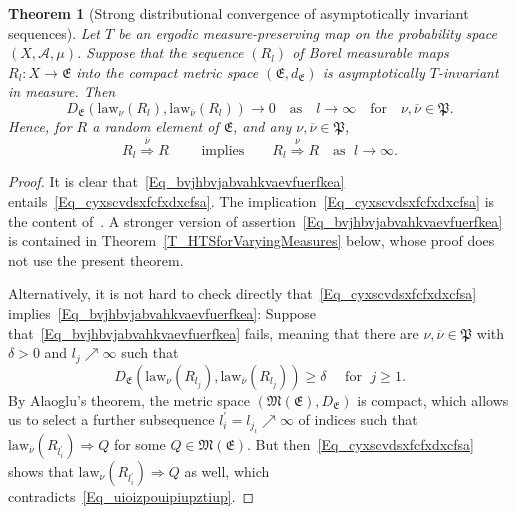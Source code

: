 \documentclass[10pt]{amsart}
\newtheorem{theo}{Theorem}[section]
\theoremstyle{definition}\newtheorem{defi}[theo]{Definition}\newtheorem{rema}[theo]{Remark}\newtheorem{exam}[theo]{Example}\newtheorem{exem}[theo]{Example}\newtheorem{nota}[theo]{Notation}
\newcommand{\clA}{\mathcal{A}}
\newcommand{\law}{\mathrm{law}}
\newcommand{\frkP}{\mathfrak{P}}
\newcommand{\frkE}{\mathfrak{E}}
\newcommand{\frkM}{\mathfrak{M}}
\begin{document}
\begin{theo}[{Strong distributional convergence of asymptotically invariant sequences}]\label{T_MyOldStrongDistrCgeThm}
Let $T$ be an ergodic measure-preserving map on the probability space $(X,\clA,\mu)$. Suppose that the sequence $(R_{l})$ of Borel measurable maps $R_{l}:X\rightarrow \frkE$ into the compact metric space $(\frkE,d_{\frkE})$ is asymptotically $T$-invariant in measure. Then
\begin{equation}\label{Eq_bvjhbvjabvahkvaevfuerfkea}
D_{\frkE}\left(\law_{\nu}(R_{l}),\law_{\overline{\nu}} (R_{l})\right)\longrightarrow0\quad\text{as}\quad l\rightarrow\infty\quad\text{for}\quad
\nu,\overline{\nu}\in\frkP. 
\end{equation}
Hence, for $R$ a random element of $\frkE$, and any $\nu,\overline{\nu }\in\frkP$,
\begin{equation}\label{Eq_cyxscvdsxfcfxdxcfsa}
R_{l}\overset{\overline{\nu}}{\Longrightarrow}R\qquad \text{ implies} \qquad R_{l}\overset{\nu}{\Longrightarrow}R\quad\text{as }\; l\rightarrow
\infty.
\end{equation}
\end{theo}


\begin{proof}
It is clear that~\eqref{Eq_bvjhbvjabvahkvaevfuerfkea} entails~\eqref{Eq_cyxscvdsxfcfxdxcfsa}. The implication~\eqref{Eq_cyxscvdsxfcfxdxcfsa} is the content of~\cite[Theorem~1]{Z7}. A stronger version of assertion~\eqref{Eq_bvjhbvjabvahkvaevfuerfkea} is contained in Theorem~\ref{T_HTSforVaryingMeasures} below, whose proof does not use the present theorem.

Alternatively, it is not hard to check directly that~\eqref{Eq_cyxscvdsxfcfxdxcfsa} implies~\eqref{Eq_bvjhbvjabvahkvaevfuerfkea}: Suppose that~\eqref{Eq_bvjhbvjabvahkvaevfuerfkea} fails, meaning that there are $\nu,\overline{\nu}\in\frkP$ with $\delta>0$ and $l_{j}
\nearrow\infty$ such that
\begin{equation}\label{Eq_uioizpouipiupztiup}
D_{\frkE}\left(\law_{\nu}\left(R_{l_{j}}\right),\law_{\overline{\nu}}\left(R_{l_{j}}\right)\right)\geq\delta\quad \text{ for }\; j\geq1.
\end{equation}
By Alaoglu's theorem, the metric space $(\frkM(\frkE),D_{\frkE})$ is compact, which allows us to select a further subsequence $l_{i}^{\prime}=l_{j_{i}}\nearrow\infty$ of indices such that $\law_{\overline{\nu}}(R_{l_{i}^{\prime}})\Longrightarrow Q$ for some $Q\in\frkM(\frkE)$. But then~\eqref{Eq_cyxscvdsxfcfxdxcfsa} shows that $\law_{\nu}(R_{l_{i}^{\prime}})\Longrightarrow Q$ as well, which contradicts~\eqref{Eq_uioizpouipiupztiup}.
\end{proof}
\end{document}
